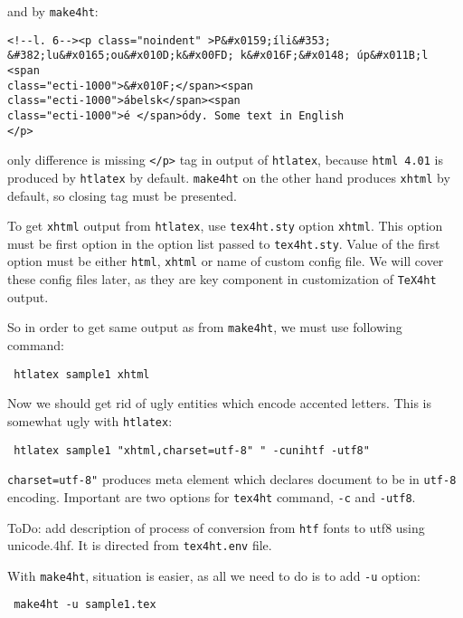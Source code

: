 and by \texttt{make4ht}:

\begin{verbatim}
<!--l. 6--><p class="noindent" >P&#x0159;íli&#353; &#382;lu&#x0165;ou&#x010D;k&#x00FD; k&#x016F;&#x0148; úp&#x011B;l <span 
class="ecti-1000">&#x010F;</span><span 
class="ecti-1000">ábelsk</span><span 
class="ecti-1000">é </span>ódy. Some text in English
</p> 
\end{verbatim}

only difference is missing \texttt{\textless{}/p\textgreater{}} tag in
output of \texttt{htlatex}, because \texttt{html\ 4.01} is produced by
\texttt{htlatex} by default. \texttt{make4ht} on the other hand produces
\texttt{xhtml} by default, so closing tag must be presented.

To get \texttt{xhtml} output from \texttt{htlatex}, use
\texttt{tex4ht.sty} option \texttt{xhtml}. This option must be first
option in the option list passed to \texttt{tex4ht.sty}. Value of the
first option must be either \texttt{html}, \texttt{xhtml} or name of
custom config file. We will cover these config files later, as they are
key component in customization of \texttt{TeX4ht} output.

So in order to get same output as from \texttt{make4ht}, we must use
following command:

\begin{verbatim}
 htlatex sample1 xhtml
\end{verbatim}

Now we should get rid of ugly entities which encode accented letters.
This is somewhat ugly with \texttt{htlatex}:

\begin{verbatim}
 htlatex sample1 "xhtml,charset=utf-8" " -cunihtf -utf8"
\end{verbatim}

\texttt{charset=utf-8"} produces meta element which declares document to
be in \texttt{utf-8} encoding. Important are two options for
\texttt{tex4ht} command, \texttt{-c} and \texttt{-utf8}.

ToDo: add description of process of conversion from \texttt{htf} fonts
to utf8 using unicode.4hf. It is directed from \texttt{tex4ht.env} file.

With \texttt{make4ht}, situation is easier, as all we need to do is to
add \texttt{-u} option:

\begin{verbatim}
 make4ht -u sample1.tex
\end{verbatim}

